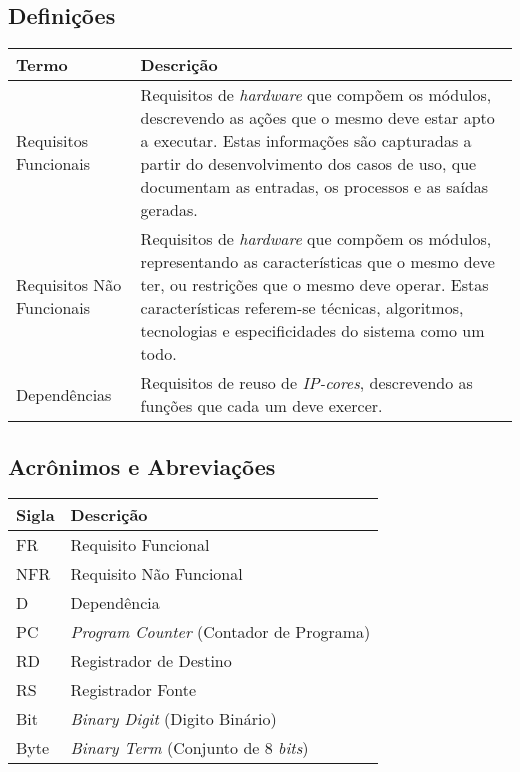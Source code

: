 \documentclass{article}
\begin{document}
  \subsection{Definições}
    \FloatBarrier
    \begin{table}[H]
      \begin{center}
        \begin{tabular}[pos]{|m{5cm} | m{9cm}|}
          \hline
          \cellcolor[gray]{0.9}\textbf{Termo} & \cellcolor[gray]{0.9}\textbf{Descrição} \\ \hline
          Requisitos Funcionais & Requisitos de \textit{hardware} que compõem os módulos, descrevendo as ações que o mesmo deve estar apto a executar. Estas informações são capturadas a partir do desenvolvimento dos casos de uso, que documentam as entradas, os processos e as saídas geradas.  \\ \hline
          Requisitos Não Funcionais & Requisitos de \textit{hardware} que compõem os módulos, representando as características que o mesmo deve ter, ou restrições que o mesmo deve operar. Estas características referem-se técnicas, algoritmos, tecnologias e especificidades do sistema como um todo.  \\ \hline
          Dependências & Requisitos de reuso de \textit{IP-cores}, descrevendo as funções que cada um deve exercer. \\ \hline
        \end{tabular}
      \end{center}
    \end{table}

  \subsection{Acrônimos e Abreviações}
    \FloatBarrier
    \begin{table}[H]
      \begin{center}
        \begin{tabular}[pos]{|m{2cm} | m{12cm}|}
          \hline
          \cellcolor[gray]{0.9}\textbf{Sigla} & \cellcolor[gray]{0.9}\textbf{Descrição} \\ \hline
          FR      & Requisito Funcional  \\ \hline
          NFR     & Requisito Não Funcional  \\ \hline
          D       & Dependência  \\ \hline
          PC      & \textit{Program Counter} (Contador de Programa)  \\ \hline
          RD      & Registrador de Destino  \\ \hline
          RS      & Registrador Fonte  \\ \hline
          Bit	  & \textit{Binary Digit} (Digito Binário) \\ \hline
          Byte	  & \textit{Binary Term} (Conjunto de 8 \textit{bits}) \\ \hline
        \end{tabular}
      \end{center}
    \end{table}
\end{document}
